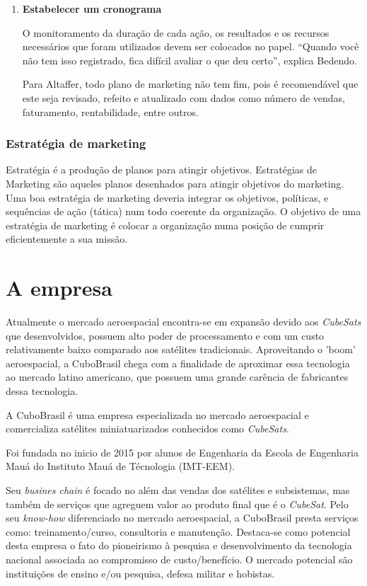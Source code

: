 \documentclass[
	12pt,				%
	openright,			%
	oneside,			%
	a4paper,			%
	english,			%
	french,				%
	spanish,			%
	brazil				%
	]{abntex2}
\begin{document}
\begin{enumerate}
		\item \textbf{Estabelecer um cronograma}
		
		O monitoramento da duração de cada ação, os resultados e os recursos necessários que foram utilizados devem ser colocados no papel. “Quando você não tem isso registrado, fica difícil avaliar o que deu certo”, explica Bedendo.
		
	Para Altaffer, todo plano de marketing não tem fim, pois é recomendável que este seja revisado, refeito e atualizado com dados como número de vendas, faturamento, rentabilidade, entre outros.
		
	\end{enumerate}

\subsection[Estratégia de marketing]{Estratégia de marketing}

	Estratégia é a produção de planos para atingir objetivos. Estratégias de Marketing são aqueles planos desenhados para atingir objetivos do marketing. Uma boa estratégia de marketing deveria integrar os objetivos, políticas, e sequências de ação (tática) num todo coerente da organização. O objetivo de uma estratégia de marketing é colocar a organização numa posição de cumprir eficientemente a sua missão.
	
\chapter[A empresa]{A empresa}

	Atualmente o mercado aeroespacial encontra-se em expansão devido aos \textit{CubeSats} que desenvolvidos, possuem alto poder de processamento e com um custo relativamente baixo comparado aos satélites tradicionais. Aproveitando o 'boom' aeroespacial, a CuboBrasil chega com a finalidade de aproximar essa tecnologia ao mercado latino americano, que possuem uma grande carência de fabricantes dessa tecnologia.
	
	A CuboBrasil é uma empresa especializada no mercado aeroespacial e comercializa satélites miniatuarizados conhecidos como \textit{CubeSats}. 
	
	Foi fundada no inicio de 2015 por alunos de Engenharia da Escola de Engenharia Mauá do Instituto Mauá de Técnologia (IMT-EEM). 
	
	Seu \textit{busines chain} é focado no além das vendas dos satélites e subsistemas, mas também de serviços que agreguem valor ao produto final que é o \textit{CubeSat}. Pelo seu \textit{know-how} diferenciado no mercado aeroespacial, a CuboBrasil presta serviços como: treinamento/curso, consultoria e manutenção. Destaca-se como potencial desta empresa o fato do pioneirismo à pesquisa e desenvolvimento da tecnologia nacional associada ao compromisso de custo/benefício. O mercado potencial são instituições de ensino e/ou pesquisa, defesa militar e hobistas.
	
\end{document}
